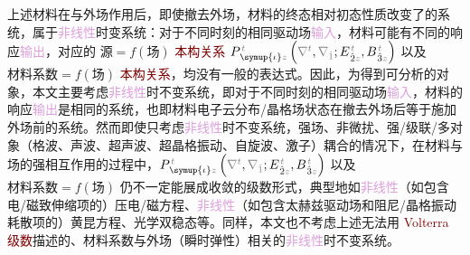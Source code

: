 上述材料在与外场作用后，即使撤去外场，材料的终态相对初态性质改变了的系统，属于\textcolor{Plum}{非线性}时变系统：对于不同时刻的相同驱动场\textcolor{Plum}{输入}，材料可能有不同的响应\textcolor{Plum}{输出}，对应的 $\text{源} = f(\text{场})$ \textcolor{Maroon}{本构关系} $P^{\;\!\mathcolor{gray}{t}}_{\;\! \symup{\iota}\mathcolor{gray}{z}} \left( \mathcolor{gray}{\nabla^t}, \mathcolor{gray}{\nabla_{\hat{1}}} ; E^{\;\!\mathcolor{gray}{t}}_{\;\! \hat{2}\mathcolor{gray}{z}}, B^{\;\!\mathcolor{gray}{t}}_{\;\! \hat{3}\mathcolor{gray}{z}} \right)$ 以及 $\text{材料系数} = f(\text{场})$ \textcolor{Maroon}{本构关系}，均没有一般的表达式。因此，为得到可分析的对象，本文主要考虑\textcolor{Plum}{非线性}时不变系统\cite{zalevskyOpticalImplementationSecondorder2001}，即对于不同时刻的相同驱动场\textcolor{Plum}{输入}，材料的响应\textcolor{Plum}{输出}是相同的系统，也即材料电子云分布/晶格场状态在撤去外场后等于施加外场前的系统。然而即使只考虑\textcolor{Plum}{非线性}时不变系统，强场、\textcolor{NavyBlue}{非微扰}、强/级联/多对象（格波、声波、超声波、超晶格振动、自旋波、激子）耦合的情况下，在材料与场的强相互作用的过程中，$P^{\;\!\mathcolor{gray}{t}}_{\;\! \symup{\iota}\mathcolor{gray}{z}} \left( \mathcolor{gray}{\nabla^t}, \mathcolor{gray}{\nabla_{\hat{1}}} ; E^{\;\!\mathcolor{gray}{t}}_{\;\! \hat{2}\mathcolor{gray}{z}}, B^{\;\!\mathcolor{gray}{t}}_{\;\! \hat{3}\mathcolor{gray}{z}} \right)$ 以及 $\text{材料系数} = f(\text{场})$ 仍不一定能展成收敛的级数形式，典型地如\textcolor{Plum}{非线性}（如包含电/磁致伸缩项的）\textcolor{NavyBlue}{压电}/\textcolor{NavyBlue}{磁方程}、\textcolor{Plum}{非线性}（如包含太赫兹驱动场和阻尼/晶格振动耗散项的）\textcolor{NavyBlue}{黄昆方程}\cite{wuqiangShouJiShengZiJiHuaJiYuanYuTaiHeZiGuangWuLiTeYao2024}、\textcolor{NavyBlue}{光学双稳态}\cite{boydNonlinearOptics2019}等。同样，本文也不考虑上述无法用 \textcolor{Maroon}{Volterra 级数}\cite{pintoExactVolterraseriesComputation1982,shenNonlinearOpticalSusceptibilities2001}描述的、材料系数与外场（\textcolor{NavyBlue}{瞬时弹性}）相关的\textcolor{Plum}{非线性}时不变系统。

